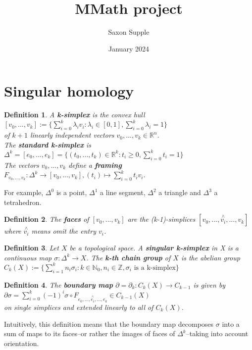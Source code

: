 \documentclass{article}
\title{MMath project}
\author{Saxon Supple }
\date{January 2024}
\newtheorem{definition}{Definition}
\begin{document}
\maketitle

\section{Singular homology}
\begin{definition}
A \textbf{k-simplex} is the convex hull\\
$[v_0,...,v_k]:=\{\sum_{i=0}^k\lambda_iv_i:\lambda_i\in [0,1],\sum_{i=0}^k\lambda_i=1\}$\\
of $k+1$ linearly independent vectors $v_0,...,v_k\in\mathbb{R}^n$.\\
The \textbf{standard k-simplex} is\\$\Delta^k=[e_0,...,e_k]=\{(t_0,...,t_k)\in\mathbb{R}^k:t_i\geq 0, \sum_{i=0}^kt_i=1\}$\\
The vectors $v_0,...,v_k$ define a \textbf{framing} $F_{v_0,...,v_k}:\Delta^k\rightarrow [v_0,...,v_k],(t_i)\mapsto \sum_{i=0}^kt_iv_i$.
\end{definition}


\noindent For example, $\Delta^0$ is a point, $\Delta^1$ a line segment, $\Delta^2$ a triangle and $\Delta^3$ a tetrahedron.

\begin{definition}
The \textbf{faces} of $[v_0,...,v_k]$ are the (k-1)-simplices $[v_0,...,\overset{\wedge}{v_i},...,v_k]$ where $\overset{\wedge}{v_i}$ means omit the entry $v_i$.
\end{definition}

\begin{definition}
Let $X$ be a topological space. A \textbf{singular k-simplex} in X is a continuous map $\sigma:\Delta^k\rightarrow X$. The \textbf{k-th chain group} of $X$ is the abelian group\\
$C_k(X):=\{\sum_{i=1}^kn_i\sigma_i:k\in\mathbb{N}_0,n_i\in\mathbb{Z},\sigma_i \text{ is a k-simplex}\}$
\end{definition}

\begin{definition}
The \textbf{boundary map} $\partial=\partial_k:C_k(X)\rightarrow C_{k-1}$ is given by\\
$\partial\sigma=\sum_{i=0}^k(-1)^i\sigma\circ F_{e_0,...,\overset{\wedge}{e_i},...,e_k}\in C_{k-1}(X)$\\
on single simplices and extended linearly to all of $C_k(X)$.
\end{definition}
\noindent Intuitively, this definition means that the boundary map decomposes $\sigma$ into a sum of maps to its faces--or rather the images of faces of $\Delta^k$--taking into account orientation.
\end{document}
